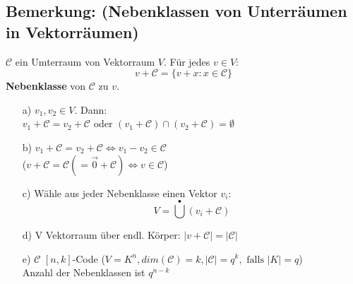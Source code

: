 \subsection{Bemerkung: (Nebenklassen von Unterr\"aumen in Vektorr\"aumen)}
$\mathcal{C}$ ein Umterraum von Vektorraum $V$. F\"ur jedes $v \in V$:
\[
	v + \mathcal{C} = \lbrace v+x : x \in \mathcal{C} \rbrace
\]
\textbf{Nebenklasse} von $\mathcal{C}$ zu $v$.
\begin{itemize}
	\item[a)] $v_1,v_2 \in V$. Dann: \\
					$v_1 + \mathcal{C} = v_2 + \mathcal{C}$ oder $(v_1 + \mathcal{C}) \cap (v_2 + \mathcal{C}) = \emptyset$
	\item[b)] $v_1 + \mathcal{C} = v_2 + \mathcal{C} \Leftrightarrow v_1-v_2 \in \mathcal{C}$\\
						($v+ \mathcal{C} = \mathcal{C} (=\vec{0}+\mathcal{C}) \Leftrightarrow v \in \mathcal{C}$)
	\item[c)] W\"ahle aus jeder Nebenklasse einen Vektor $v_i$:\\
	\[
			V=\bigcup^{\bullet} (v_i + \mathcal{C})
	\]
	\item[d)] V Vektorraum \"uber endl. K\"orper: $\left| v + \mathcal{C} \right| = \left| \mathcal{C} \right|$
	\item[e)] $\mathcal{C}$ $[n,k]$-Code ($V=K^n, dim(\mathcal{C})=k,\left|\mathcal{C}\right|=q^k, \text{ falls } \left|K\right|=q$) \\
						Anzahl der Nebenklassen ist $q^{n-k}$
\end{itemize}

